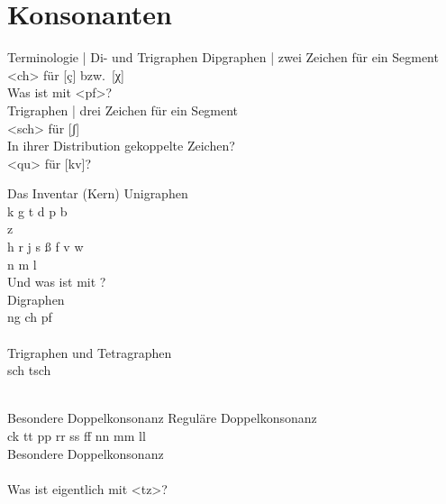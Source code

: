 \section{Konsonanten}

\begin{frame}
  {Terminologie | Di- und Trigraphen}
  \onslide<+->
  \onslide<+->
  Dipgraphen | zwei Zeichen für ein Segment\\
  \Viertelzeile
  \alert{<ch>} für [ç] bzw.\ [χ]\\
  \onslide<+->
  \Viertelzeile
  Was ist mit \alert{<pf>}?\\
  \onslide<+->
  \Zeile
  Trigraphen | drei Zeichen für ein Segment\\
  \Viertelzeile
  \alert{<sch>} für [ʃ]\\
  \Zeile
  \onslide<+->
  In ihrer Distribution gekoppelte Zeichen?\\
  \Viertelzeile
  \alert{<qu>} für [kv]?
\end{frame}

\begin{frame}
  {Das Inventar (Kern)}
  \onslide<+->
  \onslide<+->
  Unigraphen\\
  \Viertelzeile
  \alert{k g t d p b}\\
  \alert{z}\\
  \alert{h r j s ß f v w}\\
  \alert{n m l}\\
  \onslide<+->
  \Halbzeile
  Und was ist mit ?\\
  \onslide<+->
  \Halbzeile
  Digraphen\\
  \Viertelzeile
  \alert{ng ch pf}\\
  \\
  \Halbzeile
  \onslide<+->
  Trigraphen und Tetragraphen\\
  \Viertelzeile
  \alert{sch tsch}\\
  \\
\end{frame}

\begin{frame}
  {Besondere Doppelkonsonanz}
  \onslide<+->
  \onslide<+->
  Reguläre Doppelkonsonanz\\
  \Viertelzeile
  \alert{ck tt pp rr ss ff nn mm ll}\\
  \onslide<+->
  \Halbzeile
  Besondere Doppelkonsonanz\\
  \Viertelzeile
  \\
  \onslide<+->
  \Zeile
  Was ist eigentlich mit \alert{<tz>}?
\end{frame}

